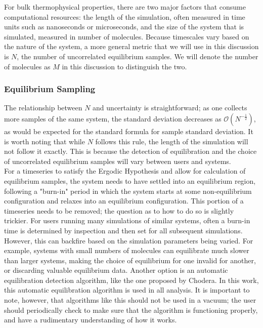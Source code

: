 \documentclass[9pt,bestpractices]{livecoms}
\begin{document}
For bulk thermophysical properties, there are two major factors that consume computational resources: the length of the simulation, often measured in time units such as nanoseconds or microseconds, and the size of the system that is simulated, measured in number of molecules.  Because timescales vary based on the nature of the system, a more general metric that we will use in this discussion is $N$, the number of uncorrelated equilibrium samples. We will denote the number of molecules as $M$ in this discussion to distinguish the two.
\subsubsection{Equilibrium Sampling}
The relationship between $N$ and uncertainty is straightforward; as one collects more samples of the same system, the standard deviation decreases as $\mathcal{O} (N^{-\frac{1}{2}})$, as would be expected for the standard formula for sample standard deviation.  It is worth noting that while $N$ follows this rule, the length of the simulation will not follow it exactly.  This is because the detection of equilibration and the choice of uncorrelated equilibrium samples will vary between users and systems.  
\\
For a timeseries to satisfy the Ergodic Hypothesis and allow for calculation of equilibrium samples, the system needs to have settled into an equilibrium region, following a "burn-in" period in which the system starts at some non-equilibrium configuration and relaxes into an equilibrium configuration.  This portion of a timeseries needs to be removed; the question as to how to do so is slightly trickier.  For users running many simulations of similar systems, often a burn-in time is determined by inspection and then set for all subsequent simulations. However, this can backfire based on the simulation parameters being varied.  For example, systems with small numbers of molecules can equilibrate much slower than larger systems, making the choice of equilibrium for one invalid for another, or discarding valuable equilibrium data.  Another option is an automatic equilibration detection algorithm, like the one proposed by Chodera. %
In this work, this automatic equilibration algorithm is used in all analysis.  It is important to note, however, that algorithms like this should not be used in a vacuum;  the user should periodically check to make sure that the algorithm is functioning properly, and have a rudimentary understanding of how it works.
\end{document}
